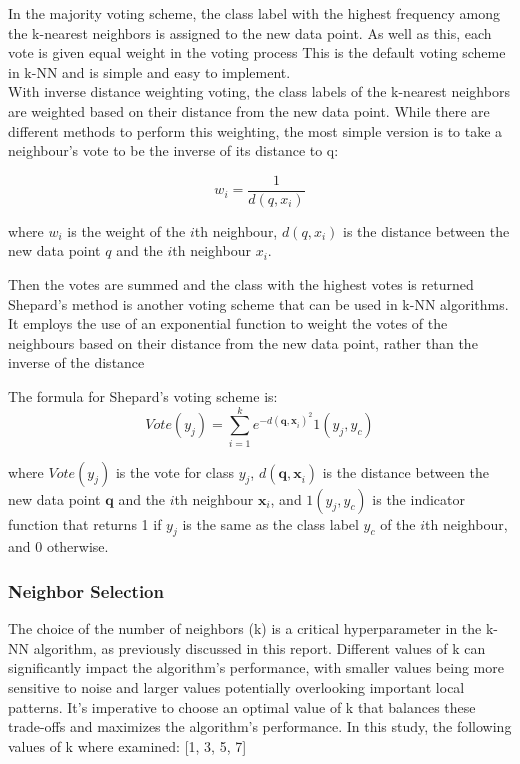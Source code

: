 In the majority voting scheme, the class label with the highest frequency among the k-nearest neighbors is assigned to the new data point.
As well as this, each vote is given equal weight in the voting process\cite{uccNotes}
This is the default voting scheme in k-NN and is simple and easy to implement.\\

With inverse distance weighting voting, the class labels of the k-nearest neighbors are weighted based on their distance from the new data point.
While there are different methods to perform this weighting, the most simple version is to take a neighbour's vote to be the inverse
of its distance to q:

\[ w_i = \frac{1}{d(q, x_i)} \]

where \(w_i\) is the weight of the \(i\)th neighbour, \(d(q, x_i)\) is the distance between the new data point \(q\) and the \(i\)th neighbour \(x_i\).

Then the votes are summed and the class with the highest votes is returned\cite{uccNotes}\\

Shepard's method is another voting scheme that can be used in k-NN algorithms. 
It employs the use of an exponential function to weight the votes of the neighbours based on their distance from the new data point,
rather than the inverse of the distance\cite{Cunningham2021}

The formula for Shepard's voting scheme is:
\begin{equation} 
    Vote(y_j)=\sum_{i=1}^k e^{-d(\mathbf{q,x}_i)^2}1(y_j,y_c)
\end{equation}

where \(Vote(y_j)\) is the vote for class \(y_j\), \(d(\mathbf{q,x}_i)\) is the
distance between the new data point \(\mathbf{q}\) and the \(i\)th neighbour \(\mathbf{x}_i\),
and \(1(y_j,y_c)\) is the indicator function that returns 1 if \(y_j\) is the same as
the class label \(y_c\) of the \(i\)th neighbour, and 0 otherwise.\\

\subsubsection*{Neighbor Selection}
The choice of the number of neighbors (k) is a critical hyperparameter in the k-NN algorithm, as previously discussed in this report.
Different values of k can significantly impact the algorithm's performance,
with smaller values being more sensitive to noise and larger values potentially overlooking important local patterns.
It's imperative to choose an optimal value of k that balances these trade-offs and maximizes the algorithm's performance.
In this study, the following values of k where examined: [1, 3, 5, 7] \\

